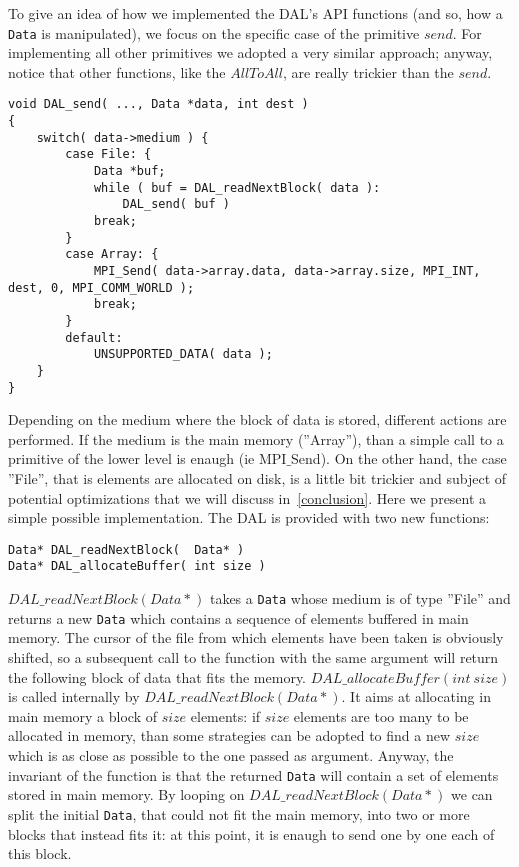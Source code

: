 To give an idea of how we implemented the DAL's API functions (and so, how a \texttt{Data} is manipulated), we focus on the specific case of the primitive $send$. For implementing all other primitives we adopted a very similar approach; anyway, notice that other functions, like the $AllToAll$, are really trickier than the $send$. 
\begin{lstlisting}
void DAL_send( ..., Data *data, int dest )
{
	switch( data->medium ) {
		case File: {
			Data *buf;
			while ( buf = DAL_readNextBlock( data ):
				DAL_send( buf )
			break;
		}
		case Array: {
			MPI_Send( data->array.data, data->array.size, MPI_INT, dest, 0, MPI_COMM_WORLD );
			break;
		}
		default:
			UNSUPPORTED_DATA( data );
	}
}
\end{lstlisting}
Depending on the medium where the block of data is stored, different actions are performed. If the medium is the main memory (''Array''), than a simple call to a primitive of the lower level is enaugh (ie MPI$\_$Send). On the other hand, the case ''File'', that is elements are allocated on disk, is a little bit trickier and subject of potential optimizations that we will discuss in~\ref{conclusion}. Here we present a simple possible implementation. The DAL is provided with two new functions: 
\begin{lstlisting}
Data* DAL_readNextBlock(  Data* )
Data* DAL_allocateBuffer( int size )
\end{lstlisting}
$DAL\_readNextBlock( Data* )$ takes a \texttt{Data} whose medium is of type ''File'' and returns a new \texttt{Data} which contains a sequence of elements buffered in main memory. The cursor of the file from which elements have been taken is obviously shifted, so a subsequent call to the function with the same argument will return the following block of data that fits the memory. $DAL\_allocateBuffer( int\ size )$ is called internally by $DAL\_readNextBlock( Data* )$. It aims at allocating in main memory a block of $size$ elements: if $size$ elements are too many to be allocated in memory, than some strategies can be adopted to find a new $size$ which is as close as possible to the one passed as argument. Anyway, the invariant of the function is that the returned \texttt{Data} will contain a set of elements stored in main memory. 
By looping on $DAL\_readNextBlock( Data* )$ we can split the initial \texttt{Data}, that could not fit the main memory, into two or more blocks that instead fits it: at this point, it is enaugh to send one by one each of this block.


